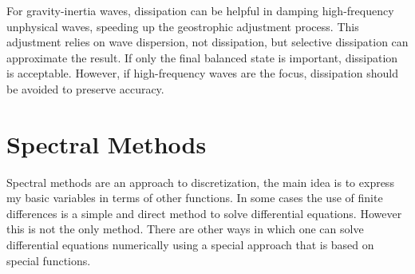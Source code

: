 For gravity-inertia waves, dissipation can be helpful in damping high-frequency unphysical waves, speeding up the geostrophic adjustment process. This adjustment relies on wave dispersion, not dissipation, but selective dissipation can approximate the result. If only the final balanced state is important, dissipation is acceptable. However, if high-frequency waves are the focus, dissipation should be avoided to preserve accuracy.
\section{Spectral Methods}\label{sec:spectral method}
Spectral methods are an approach to discretization, the main idea is to express my basic variables in terms of other functions.
In some cases the use of finite differences is a simple and direct method to solve differential equations. However this is not the only method. There are other ways in which one can solve differential equations numerically using a special approach that is based on special functions.
